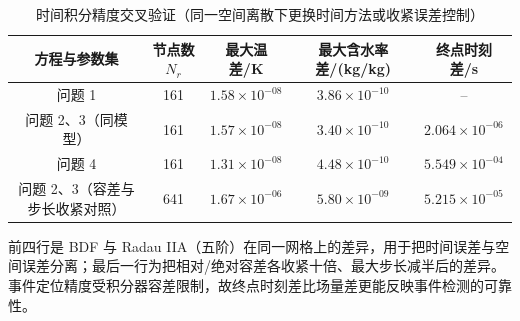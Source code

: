 \begin{table}[htbp]
  \centering
  \caption{时间积分精度交叉验证（同一空间离散下更换时间方法或收紧误差控制）}
  \label{tab:validation-time}
  \scriptsize
  \begin{tabular}{ccccc}
    \toprule
    方程与参数集 & 节点数 $N_r$ & 最大温差/K & 最大含水率差/(kg/kg) & 终点时刻差/s \\
    \midrule
    问题 1 & 161 & $1.58\times10^{-08}$ & $3.86\times10^{-10}$ & -- \\
    问题 2、3（同模型） & 161 & $1.57\times10^{-08}$ & $3.40\times10^{-10}$ & $2.064\times10^{-06}$ \\
    问题 4 & 161 & $1.31\times10^{-08}$ & $4.48\times10^{-10}$ & $5.549\times10^{-04}$ \\
    问题 2、3（容差与步长收紧对照） & 641 & $1.67\times10^{-06}$ & $5.80\times10^{-09}$ & $5.215\times10^{-05}$ \\
    \bottomrule
  \end{tabular}
  \par\smallskip\footnotesize 前四行是 BDF 与 Radau IIA（五阶）在同一网格上的差异，用于把时间误差与空间误差分离；最后一行为把相对/绝对容差各收紧十倍、最大步长减半后的差异。事件定位精度受积分器容差限制，故终点时刻差比场量差更能反映事件检测的可靠性。
\end{table}
